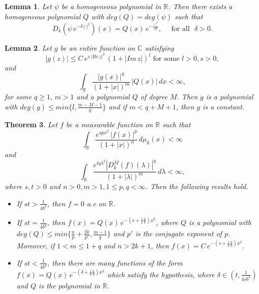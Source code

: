 \documentclass[12pt,a4paper,reqno]{amsproc}
\newtheorem{theorem}{Theorem}[section]
\newtheorem{lemma}[theorem]{Lemma}
\theoremstyle{definition}
\theoremstyle{remark}
\numberwithin{equation}{section}
\begin{document}
\begin{lemma}\label{l:3.4}\cite{kawazoe2010uncertainty}
Let $\psi$ be a homogeneous polynomial in $\mathbb{R}$. Then there exists a homogeneous polynomial $Q$ with  $deg (Q) = deg(\psi)$ such that 
\begin{equation*}
D_k(\psi\,e^{-\delta\,|\cdot|^2})(x) = Q(x)\, e^{-\frac{|\cdot|^2}{4 \delta}}, \quad \text{ for all} \,\,\,\, \delta >0.    
\end{equation*}
\end{lemma}
\begin{lemma} \label{l:3.5}\cite{ray2004cowling}
Let $g$ be an entire function on $\mathbb{C}$ satisfying 
\begin{equation*}
|g(z)| \le C\, e^{s\,|Re\, z|^2}\,(1+|Im\, z|)^l  \text{ for some $l>0, s>0$},  
\end{equation*}
and
\begin{equation*}
\int_{\mathbb{R}}  \frac{|g(x)|^q}{(1+|x|)^m}\, |Q(x)|\, dx < \infty,  
\end{equation*}
for some $q\ge 1, \, m>1$ and a polynomial $Q$ of degree $M$. Then
$g$ is a polynomial with $deg (g) \le min \{l, \frac{m-M-1}{q}\}$ and if  $m<q+M+1$, then $g$ is a constant.
\end{lemma}
\begin{theorem}
Let $f$ be a measurable function on $\mathbb{R}$  such that
\begin{equation} \label{e:3.11}
\int_{\mathbb{R}} \frac{e^{spx^2}\,|f(x)|^p}{(1+|x|)^n}\, d\mu_k(x) <\infty 
\end{equation}
and 
\begin{equation} \label{e:3.12}
\int_{\mathbb{R}} \frac{e^{tq\lambda^2} |D_k^M(f)(\lambda)|^q}{(1+|\lambda|)^m}\, d\lambda <\infty,
\end{equation}
where $s,t>0$ and $n>0, m>1, 1\le p,q <\infty$. Then the following results hold.
\begin{itemize}
    \item [$(i)$] If $st>\frac{1}{4b^2}$, then $f=0$ a.e on $\mathbb{R}$.
    \item[$(ii)$] If $st= \frac{1}{4b^2}$, then  $f(x) = Q(x)\, e^{-(s+\frac{i}{2}\frac{a}{b})x^2}$, where $Q$ is a polynomial with $deg(Q) \le min \{\frac{n}{p}+ \frac{2k}{p'}, \frac{m-1}{q}\}$ and $p'$ is the conjugate exponent of $p$. Moreover, if  $1<m \le 1+q$ and $n>2k+1$, then $f(x)= C\,  e^{-(s+\frac{i}{2}\frac{a}{b})x^2}$. 
\item[$(iii)$] If $st<\frac{1}{4b^2}$, then there are many functions of the form $f(x) = Q(x)\,e^{-(\delta
+\frac{i}{2}\frac{a}{b})x^2}$ which satisfy the hypothesis, where $\delta \in (t, \frac{1}{4sb^2})$ and $Q$ is the polynomial in $\mathbb{R}$. 
\end{itemize}
\end{theorem}
\end{document}
